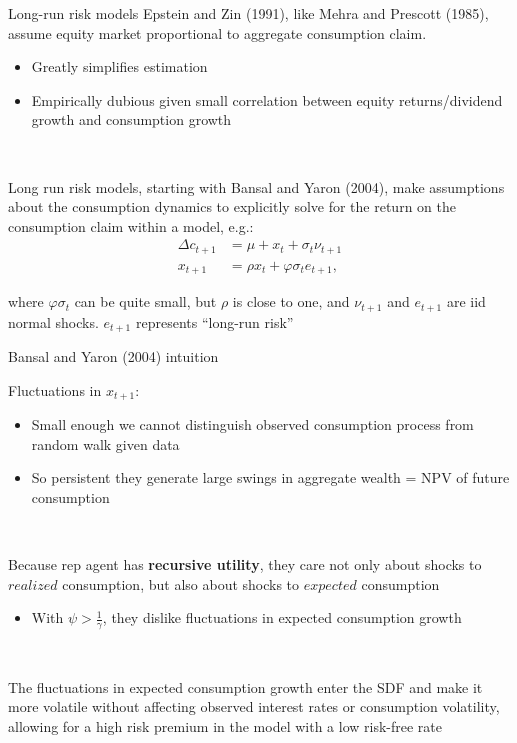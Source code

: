 \documentclass[xcolor=table, aspectratio=169]{beamer}
\newcommand{\alertbf}[1]{\alert{\textbf{#1}}}
\begin{document}
\begin{frame}{Long-run risk models}
Epstein and Zin (1991), like Mehra and Prescott (1985), assume equity market proportional to aggregate consumption claim.
\begin{itemize}
\item Greatly simplifies estimation 
\item Empirically dubious given small correlation between equity returns/dividend growth and consumption growth
\end{itemize}
~

Long run risk models, starting with Bansal and Yaron (2004), make assumptions about the consumption dynamics to explicitly solve for the return on the consumption claim within a model, e.g.:
\begin{align*}
\Delta c_{t+1} &= \mu + x_t + \sigma_t\nu_{t+1}\\
x_{t+1} &= \rho x_t + \varphi \sigma_t e_{t+1},
\end{align*}

where $\varphi \sigma_t $ can be quite small, but $\rho$ is close to one, and $\nu_{t+1}$ and $e_{t+1}$ are iid normal shocks. $e_{t+1}$ represents ``long-run risk''

\end{frame}

\begin{frame}{Bansal and Yaron (2004) intuition}

Fluctuations in $x_{t+1}$:
\begin{itemize}
\item Small enough we cannot distinguish observed consumption process from random walk given data
\item So persistent they generate large swings in aggregate wealth = NPV of future consumption
\end{itemize}

~

Because rep agent has \alertbf{recursive utility}, they care not only about shocks to $realized$ consumption, but also about shocks to $expected$ consumption
\begin{itemize}
    \item With $\psi > \frac{1}{\gamma}$, they dislike fluctuations in expected consumption growth
\end{itemize}

~

The fluctuations in expected consumption growth enter the SDF and make it more volatile without affecting observed interest rates or consumption volatility, allowing for a high risk premium in the model with a low risk-free rate

\end{frame}
\end{document}

